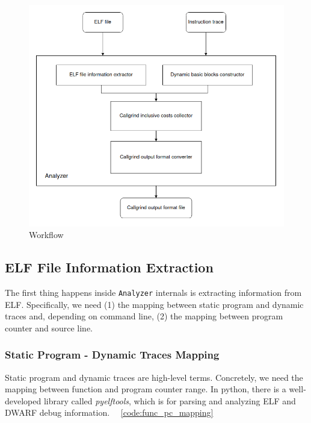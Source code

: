 \medskip
{}
\medskip

\begin{figure}
    \centering
    \includegraphics[width=\linewidth]{figures/Analyzer_structure.png}
    \caption{Workflow}
    \label{fig:analyzer_structure}
\end{figure}


\subsection{ELF File Information Extraction} 
\label{subsec: elf_info_extraction}

The first thing happens inside \texttt{Analyzer} internals is extracting information from ELF. Specifically, we need (1) the mapping between static program and dynamic traces and, depending on command line, (2) the mapping between program counter and source line.

\subsubsection{Static Program - Dynamic Traces Mapping}

Static program and dynamic traces are high-level terms. Concretely, we need the mapping between function and program counter range. In python, there is a well-developed library called \textit{pyelftools}, which is for parsing and analyzing ELF and DWARF debug information.~\cite{pyelftools_manual} ~\ref{code:func_pc_mapping}

